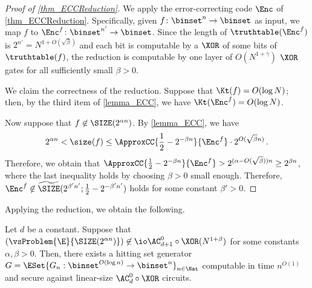 \documentclass{toc}
\begin{document}
\begin{proof}
  [Proof of \cref{thm_ECCReduction}]
  We apply the error-correcting code $\Enc$ of \cref{thm_ECCReduction}.
  Specifically, given $f \colon \binset^n \to \binset$ as input,
  we map $f$ to $\Enc^f \colon \binset^{n'} \to \binset$.
  Since the length of $\truthtable(\Enc^f)$ is $2^{n'} = N^{1 + O(\sqrt{\beta})}$ and each bit is computable by a $\XOR$ of some bits of $\truthtable(f)$,
  the reduction is computable by one layer of $O(N^{1 + \gamma})$ $\XOR$ gates
  for all sufficiently small $\beta > 0$.

  We claim the correctness of the reduction.
  Suppose that
  $\Kt(f) = O(\log N)$; then, by the third item of \cref{lemma_ECC}, we have $\Kt(\Enc^f) = O(\log N)$.

  Now suppose that $f \not\in \SIZE(2^{\alpha n})$.
  By \cref{lemma_ECC}, we have
  \[ 2^{\alpha n} < \size(f) \le
    \ApproxCC{\frac{1}{2} - 2^{- \beta n}}{\Enc^f} \cdot 2^{O(\sqrt{\beta} n)}\,.
  \]
  Therefore, we obtain that $\ApproxCC{\frac{1}{2} - 2^{- \beta n}}{\Enc^f} > 2^{(\alpha - O(\sqrt{\beta})) n} \ge 2^{\beta n}$,
  where the last inequality holds by choosing $\beta > 0$ small enough.
  Therefore,
  $\Enc^f \not\in \widetilde{\SIZE}(2^{\beta' n'}; \frac{1}{2} - 2^{-\beta' n'})$
  holds for some constant $\beta' > 0$.
\end{proof}

Applying the reduction, we obtain the following.
\begin{theorem}
  \label{thm_AC0XOR}
  Let $d$ be a constant.
  Suppose that
  $(\vsProblem{\E}{\SIZE (2^{\alpha n})}) \not\in \io \AC^0_{d+1} \circ \XOR (N^{1 + \beta})$
  for some constants $\alpha, \beta > 0$.
  Then,
  there exists a hitting set generator $G = \ESet{ G_n : \binset^{O(\log n)} \to \binset^n }_{n \in \Nat} $ computable in time $n^{O(1)}$ and secure against linear-size $\AC^0_{d} \circ \XOR$ circuits.
\end{theorem}
\end{document}
